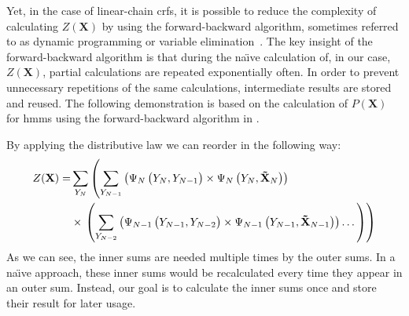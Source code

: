 Yet, in the case of \glspl{linear-chain crf}, it is possible to reduce the complexity of calculating $Z(\mathbf{X})$ by using the forward-backward algorithm, sometimes referred to as dynamic programming or variable elimination~\citep{sutton2010introduction,koller2009probabilistic}.
The key insight of the forward-backward algorithm is that during the na\"{\i}ve calculation of, in our case, $Z(\mathbf{X})$, partial calculations are repeated exponentially often.
In order to prevent unnecessary repetitions of the same calculations, intermediate results are stored and reused.
The following demonstration is based on the calculation of $P(\mathbf{X})$ for \glspl{hmm} using the forward-backward algorithm in \citet{sutton2010introduction}.

\bigskip

By applying the distributive law we can reorder  in the following way:
\begin{equation}
  \begin{split}
    Z(\mathbf{X}) = & \sum_{Y_N}\left(\sum_{Y_{N-1}}\left(\Psi_N\left(\vphantom{\tilde{X}}Y_N,Y_{N-1}\right)\times\Psi_N\left(Y_N,\mathbf{\tilde{X}}_N\right)\right)\right.\\
    & \times\left.\left(\sum_{Y_{N-2}}\left(\Psi_{N-1}\left(\vphantom{\tilde{X}}Y_{N-1},Y_{N-2}\right)\times\Psi_{N-1}\left(Y_{N-1},\mathbf{\tilde{X}}_{N-1}\right)\right)\dots\vphantom{\sum_{Y_N}}\right)\right)
  \end{split}
  \label{equ:linear-chain-crf-z-distributive}
\end{equation}
As we can see, the inner sums are needed multiple times by the outer sums.
In a na\"{\i}ve approach, these inner sums would be recalculated every time they appear in an outer sum.
Instead, our goal is to calculate the inner sums once and store their result for later usage.

\bigskip

